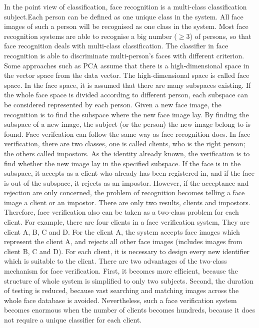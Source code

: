 In the point view of classification, face recognition is a multi-class classification subject.Each person can be defined as one unique class in the system. All face images of such a person will be recognised as one class in the system. Most face recognition systems are able to recognise a big number ($\geq 3$) of persons, so that face recognition deals with multi-class classification. The classifier in face recognition is able to discriminate multi-person's faces with different criterion. Some approaches such as PCA assume that there is a high-dimensional space in the vector space from the data vector. The high-dimensional space is called face space. In the face space, it is assumed that there are many subspaces existing. If the whole face space is divided according to different person, each subspace can be considered represented by each person. Given a new face image, the recognition is to find the subspace where the new face image lay. By finding the subspace of a new image, the subject (or the person) the new image belong to is found. Face verifcation can follow the same way as face recognition does. In face verification, there are two classes, one is called clients, who is the right person; the others called impostors. As the identity already known, the verification is to find whether the new image lay in the specified subspace. If the face is in the subspace, it accepts as a client who already has been registered in, and if the face is out of the subspace, it rejects as an impostor. However, if the acceptance and rejection are only concerned, the problem of recognition becomes telling a face image a client or an impostor. There are only two results, clients and impostors. Therefore, face verification also can be taken as a two-class problem for each client. For example, there are four clients in a face verification system, They are client A, B, C and D. For the client A, the system accepts face images which represent the client A, and rejects all other face images (includes images from client B, C and D).  For each client, it is necessary to design every new identifier which is suitable to the client. There are two advantages of the two-class mechanism for face verification. First, it becomes more efficient, because the structure of whole system is simplified to only two subjects. Second, the duration of testing is reduced, because vast searching and matching images across the whole face database is avoided. Nevertheless, such a face verification system becomes enormous when the number of clients becomes hundreds, because it does not require a unique classifier for each client. 
